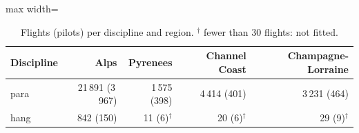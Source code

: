 \begin{table}
\centering
\small
\renewcommand{\arraystretch}{1.15}\setlength{\tabcolsep}{4pt}
\begin{adjustbox}{max width=\textwidth}
\begin{tabular}{lrrrr}
\toprule
Discipline & Alps & Pyrenees & Channel Coast & Champagne-Lorraine \\
\midrule
para & 21\,891 (3\,967) & 1\,575 (398) & 4\,414 (401) & 3\,231 (464) \\
hang & 842 (150) & 11 (6)$^\dagger$ & 20 (6)$^\dagger$ & 29 (9)$^\dagger$ \\
\bottomrule
\end{tabular}
\end{adjustbox}
\caption{Flights (pilots) per discipline and region. $^\dagger$ fewer than 30 flights: not fitted.}\label{tab:regions-counts}
\end{table}
